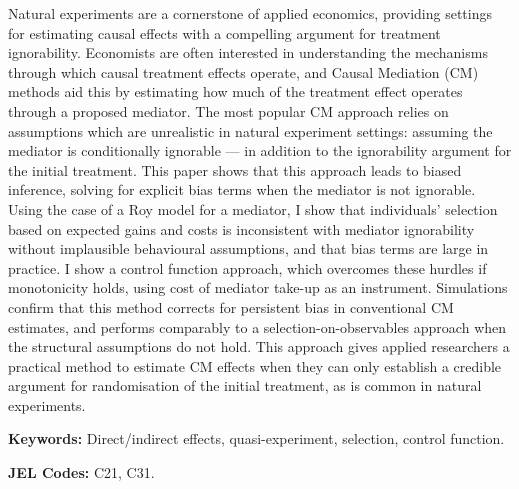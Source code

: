 \noindent
Natural experiments are a cornerstone of applied economics, providing settings for estimating causal effects with a compelling argument for treatment ignorability.
Economists are often interested in understanding the mechanisms through which causal treatment effects operate, and Causal Mediation (CM) methods aid this by estimating how much of the treatment effect operates through a proposed mediator.
The most popular CM approach relies on assumptions which are unrealistic in natural experiment settings: assuming the mediator is conditionally ignorable --- in addition to the ignorability argument for the initial treatment.
This paper shows that this approach leads to biased inference, solving for explicit bias terms when the mediator is not ignorable.
Using the case of a Roy model for a mediator, I show that individuals' selection based on expected gains and costs is inconsistent with mediator ignorability without implausible behavioural assumptions, and that bias terms are large in practice.
I show a control function approach, which overcomes these hurdles if monotonicity holds, using cost of mediator take-up as an instrument.
Simulations confirm that this method corrects for persistent bias in conventional CM estimates, and performs comparably to a selection-on-observables approach when the structural assumptions do not hold.
This approach gives applied researchers a practical method to estimate CM effects when they can only establish a credible argument for randomisation of the initial treatment, as is common in natural experiments.

\vspace{0.5cm}
\noindent
\textbf{Keywords:}
Direct/indirect effects, quasi-experiment, selection, control function.

\vspace{0.1cm}
\noindent
\textbf{JEL Codes:}
C21, C31.
